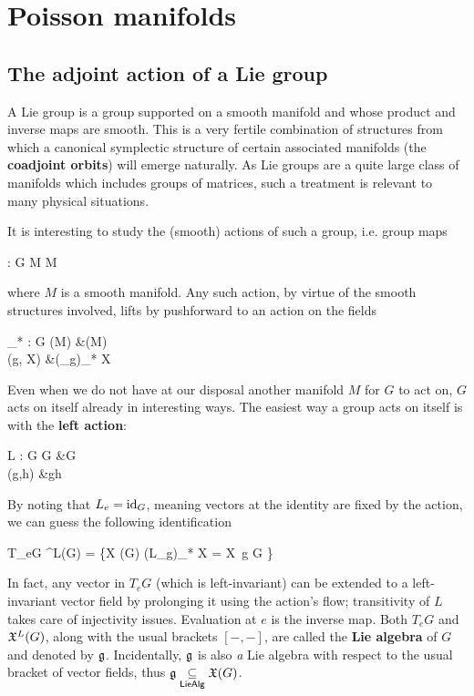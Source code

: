 \chapter{Poisson manifolds}
\section{The adjoint action of a Lie group}
A Lie group is a group supported on a smooth manifold and whose product and inverse maps are smooth. This is a very fertile combination of structures from which a canonical symplectic structure of certain associated manifolds (the \textbf{coadjoint orbits}) will emerge naturally. As Lie groups are a quite large class of manifolds which includes groups of matrices, such a treatment is relevant to many physical situations.

It is interesting to study the (smooth) actions of such a group, i.e. group maps
\begin{eqalign}
	\rho : G \times M \longto M
\end{eqalign}
where $M$ is a smooth manifold. Any such action, by virtue of the smooth structures involved, lifts by pushforward to an action on the fields
\begin{eqalign}
	\rho_* : G \times \fields(M) &\longto \fields(M)\\
		(g, X) &\longmapsto (\rho_g)_* X
\end{eqalign}

Even when we do not have at our disposal another manifold $M$ for $G$ to act on, $G$ acts on itself already in interesting ways. The easiest way a group acts on itself is with the \textbf{left action}:
\begin{eqalign}
	L : G \times G &\longto G\\
	(g,h) &\longmapsto gh
\end{eqalign}
By noting that $L_e = \mathrm{id}_G$, meaning vectors at the identity are fixed by the action, we can guess the following identification
\begin{eqalign}
	T_eG \iso \fields^L(G) = \{X \in \fields(G) \suchthat (L_g)_* X = X\ \forall g \in G \}
\end{eqalign}
In fact, any vector in $T_e G$ (which is left-invariant) can be extended to a left-invariant vector field by prolonging it using the action's flow; transitivity of $L$ takes care of injectivity issues. Evaluation at $e$ is the inverse map. Both $T_eG$ and $\mathfrak{X}^L(G)$, along with the usual brackets $[-,-]$, are called the \textbf{Lie algebra} of $G$ and denoted by $\mathfrak g$. Incidentally, $\mathfrak g$ is also \emph{a} Lie algebra with respect to the usual bracket of vector fields, thus $\mathfrak g \underset{\mathsf{LieAlg}}{\subseteq} \mathfrak{X}(G)$.

